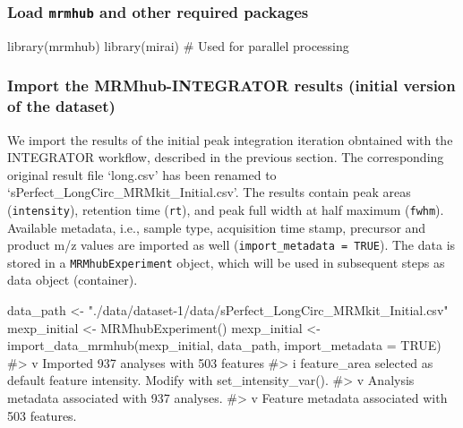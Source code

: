 \documentclass[
  letterpaper,
  DIV=11,
  numbers=noendperiod]{scrartcl}
\newenvironment{Shaded}{\begin{snugshade}}{\end{snugshade}}
\newcommand{\AttributeTok}[1]{\textcolor[rgb]{0.40,0.45,0.13}{#1}}
\newcommand{\CommentTok}[1]{\textcolor[rgb]{0.37,0.37,0.37}{#1}}
\newcommand{\ConstantTok}[1]{\textcolor[rgb]{0.56,0.35,0.01}{#1}}
\newcommand{\FunctionTok}[1]{\textcolor[rgb]{0.28,0.35,0.67}{#1}}
\newcommand{\NormalTok}[1]{\textcolor[rgb]{0.00,0.23,0.31}{#1}}
\newcommand{\OtherTok}[1]{\textcolor[rgb]{0.00,0.23,0.31}{#1}}
\newcommand{\StringTok}[1]{\textcolor[rgb]{0.13,0.47,0.30}{#1}}
\begin{document}
\subsubsection{\texorpdfstring{Load \texttt{mrmhub} and other required
packages}{Load mrmhub and other required packages}}\label{load-mrmhub-and-other-required-packages}

\begin{Shaded}
\begin{Highlighting}[]
\FunctionTok{library}\NormalTok{(mrmhub)}
\FunctionTok{library}\NormalTok{(mirai)  }\CommentTok{\# Used for parallel processing}
\end{Highlighting}
\end{Shaded}

\subsubsection{Import the MRMhub-INTEGRATOR results (initial version of
the
dataset)}\label{import-the-mrmhub-integrator-results-initial-version-of-the-dataset}

We import the results of the initial peak integration iteration
obntained with the INTEGRATOR workflow, described in the previous
section. The corresponding original result file `long.csv' has been
renamed to `sPerfect\_LongCirc\_MRMkit\_Initial.csv'. The results
contain peak areas (\texttt{intensity}), retention time (\texttt{rt}),
and peak full width at half maximum (\texttt{fwhm}). Available metadata,
i.e., sample type, acquisition time stamp, precursor and product m/z
values are imported as well (\texttt{import\_metadata\ =\ TRUE}). The
data is stored in a \texttt{MRMhubExperiment} object, which will be used
in subsequent steps as data object (container).

\begin{Shaded}
\begin{Highlighting}[]
\NormalTok{data\_path }\OtherTok{\textless{}{-}} \StringTok{"./data/dataset{-}1/data/sPerfect\_LongCirc\_MRMkit\_Initial.csv"}
\NormalTok{mexp\_initial }\OtherTok{\textless{}{-}} \FunctionTok{MRMhubExperiment}\NormalTok{()}
\NormalTok{mexp\_initial }\OtherTok{\textless{}{-}} \FunctionTok{import\_data\_mrmhub}\NormalTok{(mexp\_initial, data\_path, }\AttributeTok{import\_metadata =} \ConstantTok{TRUE}\NormalTok{)                       }
\CommentTok{\#\textgreater{} v Imported 937 analyses with 503 features}
\CommentTok{\#\textgreater{} i \textasciigrave{}feature\_area\textasciigrave{} selected as default feature intensity. Modify with \textasciigrave{}set\_intensity\_var()\textasciigrave{}.}
\CommentTok{\#\textgreater{} v Analysis metadata associated with 937 analyses.}
\CommentTok{\#\textgreater{} v Feature metadata associated with 503 features.}
\end{Highlighting}
\end{Shaded}
\end{document}
